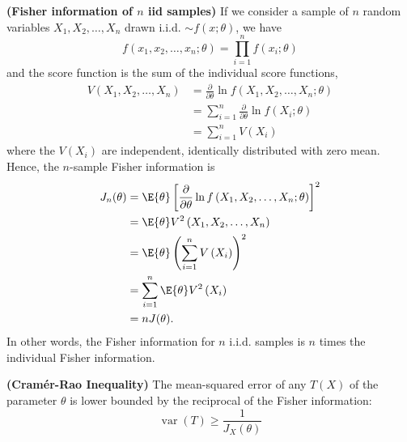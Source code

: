 \documentclass{article}
\newcommand{\bfs}[1]{\textbf{({#1})}}
\begin{document}
\begin{rema}{\bfs{Fisher information of $n$ \gls{iid} samples}}
If we consider a sample of $n$ random variables $X_{1}, X_{2}, \ldots, X_{n}$ drawn
i.i.d. $\sim f(x ; \theta)$, we have
$$
f\left(x_{1}, x_{2}, \ldots, x_{n} ; \theta\right)=\prod_{i=1}^{n} f\left(x_{i} ; \theta\right)
$$
and the score function is the sum of the individual score functions,
$$
\begin{aligned}
V\left(X_{1}, X_{2}, \ldots, X_{n}\right) &=\frac{\partial}{\partial \theta} \ln f\left(X_{1}, X_{2}, \ldots, X_{n} ; \theta\right) \\
&=\sum_{i=1}^{n} \frac{\partial}{\partial \theta} \ln f\left(X_{i} ; \theta\right) \\
&=\sum_{i=1}^{n} V\left(X_{i}\right)
\end{aligned}
$$
where the $V\left(X_{i}\right)$ are independent, identically distributed with zero mean. Hence, the $n$-sample Fisher information is
$$
\begin{aligned}
J_{n}(\theta) &=\E{\theta}\left[\frac{\partial}{\partial \theta} \ln f\left(X_{1}, X_{2}, \ldots, X_{n} ; \theta\right)\right]^{2} \\
&=\E{\theta} V^{2}\left(X_{1}, X_{2}, \ldots, X_{n}\right) \\
&=\E{\theta}\left(\sum_{i=1}^{n} V\left(X_{i}\right)\right)^{2} \\
&=\sum_{i=1}^{n} \E{\theta} V^{2}\left(X_{i}\right) \\
&=n J(\theta) .
\end{aligned}
$$
In other words, the Fisher information for $n$ i.i.d. samples is $n$ times the individual Fisher information. 
\end{rema}

\begin{thma}{\bfs{Cram\'{e}r-Rao Inequality}}\label{es:thm1}
The mean-squared error of any  $T(X)$ of the parameter $\theta$ is lower bounded by the reciprocal of the Fisher information:
$$
\operatorname{var}(T) \geq \frac{1}{J_X(\theta)}
$$
\end{thma}
\end{document}
